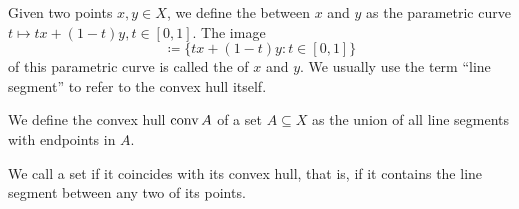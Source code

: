 \begin{definition}\label{def:convex_set}\mbox{}
  \begin{defenum}
     Given two points \( x, y \in X \), we define the  between \( x \) and \( y \) as the parametric curve \( t \mapsto tx + (1-t)y, t \in [0, 1] \). The image
    \begin{equation*}
      [x, y] \coloneqq \{ tx + (1-t)y \colon t \in [0, 1] \}
    \end{equation*}
    of this parametric curve is called the  of \( x \) and \( y \). We usually use the term \enquote{line segment} to refer to the convex hull itself.

     We define the convex hull \( \operatorname{conv} A \) of a set \( A \subseteq X \) as the union of all line segments with endpoints in \( A \).

     We call a set  if it coincides with its convex hull, that is, if it contains the line segment between any two of its points.
  \end{defenum}
\end{definition}

